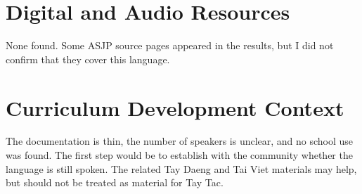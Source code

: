\documentclass[12pt]{article}
\begin{document}
\section{Digital and Audio Resources}
None found. Some ASJP source pages appeared in the results, but I did not confirm that they cover this language.

\section{Curriculum Development Context}
The documentation is thin, the number of speakers is unclear, and no school use was found. The first step would be to establish with the community whether the language is still spoken. The related Tay Daeng and Tai Viet materials may help, but should not be treated as material for Tay Tac.
\end{document}
